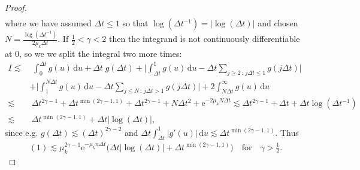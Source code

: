 \documentclass[12pt]{article} %
\newcommand{\dint}{\text{d}}
\newcommand{\abs}[1]{\left| #1 \right|}
\begin{document}
\begin{proof}
\begin{align*}
\end{align*}
where we have assumed $\Delta t \leq 1$ so that $\log(\Delta t^{-1}) = \abs{\log(\Delta t)}$ and chosen $N = \frac{\log(\Delta t^{-1})}{2 \mu_k \Delta t}$. If $\frac{1}{2} < \gamma < 2$ then the integrand is not continuously differentiable at $0$, so we  we split the integral two more times:
\begin{align*}
    I\lesssim & \, 
     \, \int_0^{\Delta t} g(u)
    \, \dint u +\Delta t\; g(\Delta t)
     +\bigg| \int_{\Delta t}^{1} 
      g(u)  
     \, \dint u - \Delta t \sum_{j\geq 2\,:\, j\Delta t\leq 1}  g(j\Delta t) 
     \bigg|  
     \\    & 
     +\bigg| \int_{1}^{N\Delta t}  g(u) 
    \, \dint u - \Delta t \sum_{ j\leq N\,:\, j\Delta t> 1}  g(j\Delta t) 
    \bigg| 
    + 2\int_{N\Delta t}^\infty  g(u) 
    \, \dint u \\[0.2cm]
    \lesssim & \ 
    \Delta t^{2\gamma-1} + \Delta t^{\min(2\gamma-1,1)} +\Delta t^{2\gamma-1}  + N\Delta t^2  + \mathrm{e}^{-2 \mu_k N \Delta t}  \lesssim \Delta t^{2\gamma-1} +\Delta t +\Delta t \log \left(\Delta t^{-1}\right)  
    \\[0.2cm]
    \lesssim &\ \Delta t^{\min( 2\gamma-1, 1)}+\Delta t \abs{ \log \left(\Delta t
    \right) }
    ,
\end{align*} 
since e.g. $g(\Delta t)\lesssim (\Delta t)^{2\gamma-2}$ and $\Delta t\int_{\Delta t}^1|g'(u)|\,\dint u \lesssim \Delta t^{\min(2\gamma-1,1)}$.
Thus 
\begin{align}\label{(1)}
(1) \lesssim \mu_k^{2 \gamma - 1} \mathrm{e}^{- \mu_k  n\Delta t}\Big(\Delta t \abs{\log(\Delta t)} +  \Delta t^{\min( 2\gamma-1, 1)}\Big)\quad\text{for}\quad \gamma>\tfrac12.

\end{align}
\end{proof}
\end{document}
